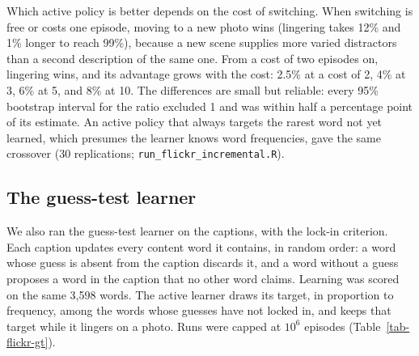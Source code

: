 \documentclass[a4paper,natbib,man]{apa6}
\begin{document}
Which active policy is better depends on the cost of switching. When switching is free or costs one episode, moving to a new photo wins (lingering takes 12\% and 1\% longer to reach 99\%), because a new scene supplies more varied distractors than a second description of the same one. From a cost of two episodes on, lingering wins, and its advantage grows with the cost: 2.5\% at a cost of 2, 4\% at 3, 6\% at 5, and 8\% at 10. The differences are small but reliable: every 95\% bootstrap interval for the ratio excluded 1 and was within half a percentage point of its estimate. An active policy that always targets the rarest word not yet learned, which presumes the learner knows word frequencies, gave the same crossover (30 replications; \texttt{run\_flickr\_incremental.R}).

\subsection{The guess-test learner}
We also ran the guess-test learner on the captions, with the lock-in criterion. Each caption updates every content word it contains, in random order: a word whose guess is absent from the caption discards it, and a word without a guess proposes a word in the caption that no other word claims. Learning was scored on the same 3,598 words. The active learner draws its target, in proportion to frequency, among the words whose guesses have not locked in, and keeps that target while it lingers on a photo. Runs were capped at $10^6$ episodes (Table~\ref{tab-flickr-gt}).
\end{document}
